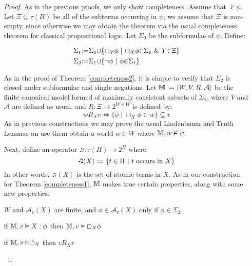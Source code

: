 \begin{proof}
  As in the previous proofs, we only show completeness.  Assume that $\nvdash
  \psi$.  Let $\Xi \subseteq \tau (\Pi)$ be all of the subterms occurring in
  $\psi$; we assume that $\Xi$ is non-empty, since otherwise we may obtain the
  theorem via the usual completeness theorem for classical propositional
  logic. Let $\Sigma_0$ be the subformulae of $\psi$.  Define:
  
  \begin{align*}
    {\Sigma}_1 &
    {\assign}{\Sigma}_0{\cup}\{\Box_Y{\phi}{\ }|{\ }\Box_X{\phi}{\in}{\Sigma}_0{\ }\&{\ }Y{\in}{\Xi}\}\\
    {\Sigma}_2 &
    {\assign}{\Sigma}_1{\cup}\{{\neg}{\phi}{\ }|{\ }{\phi}{\in}{\Sigma}_1\}
  \end{align*}
  
  As in the proof of Theorem \ref{completeness2}, it is simple to verify that
  $\Sigma_2$ is closed under subformulae and single negations.  Let
  $\mathbbm{M} \assign \langle W, V, R, \mathcal{A} \rangle$ be the finite
  canonical model formed of maximally consistent subsets of $\Sigma_2$, where
  $V$ and $\mathcal{A}$ are defined as usual, and $R : \Xi \rightarrow 2^{W
  \times W}$ is defined by:
  \[ w R_X v \Longleftrightarrow \{\phi \  | \  \Box_X
     \phi \in w\} \subseteq v \]
  As in previous constructions we may prove the usual Lindenbaum and Truth
  Lemmas an use them obtain a world $w \in W$ where $\mathbbm{M}, w \nvDash
  \psi$.
  
  
  
  Next, define an operator $\twonotes : \tau (\Pi) \rightarrow 2^{\Pi}$ where:
  \[ \twonotes (X) \assign \{t \in \Pi \  | \  t \text{
     occurs in } X\} \]
  In other words, $\twonotes (X)$ is the set of atomic terms in $X$.  As in
  our construction for Theorem \ref{completeness1}, $\mathbbm{M}$ makes true
  certain properties, along with some new properties:
  \begin{enumeratenumeric}
    \item \label{fin}$W$ and $\mathcal{A}_v (X)$ are finite, and $\phi \in
    \mathcal{A}_v (X)$ only if $\phi \in \Sigma_2$
    
    \item if $\mathbbm{M}, v \vDash X : \phi$ then $\mathbbm{M}, v \vDash
    \Box_X \phi$
    
    \item \label{refl}if $\mathbbm{M}, v \vDash \circlearrowleft_X$ then $v
    R_X v$
    

\end{enumeratenumeric}
\end{proof}
